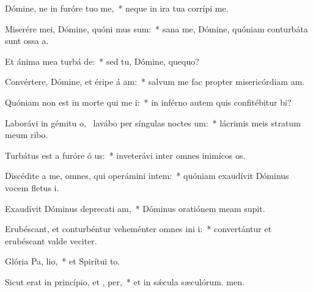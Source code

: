 \item Dómine, ne in furóre tuo  me,~* neque in ira tua corrípi me.
\item Miserére mei, Dómine, quóni mus sum:~* sana me, Dómine, quóniam conturbáta sunt ossa a.
\item Et ánima mea turbá  de:~* sed tu, Dómine, quequo?
\item Convértere, Dómine, et éripe á am:~* salvum me fac propter misericórdiam am.
\item Quóniam non est in morte qui me  i:~* in inférno autem quis confitébitur bi?
\item Laborávi in gémitu o,~\pscross{} lavábo per síngulas noctes  um:~* lácrimis meis stratum meum ribo.
\item Turbátus est a furóre ó us:~* inveterávi inter omnes inimícos os.
\item Discédite a me, omnes, qui operámini intem:~* quóniam exaudívit Dóminus vocem fletus i.
\item Exaudívit Dóminus deprecati am,~* Dóminus oratiónem meam supit.
\item Erubéscant, et conturbéntur veheménter omnes ini i:~* convertántur et erubéscant valde veciter.
\item Glória Pa,  lio,~* et Spirítui to.
\item Sicut erat in princípio, et ,  per,~* et in sǽcula sæculórum. men.
